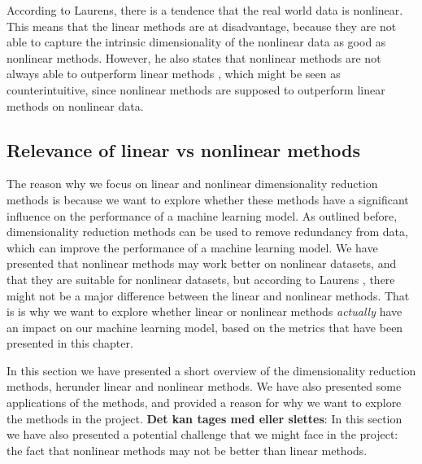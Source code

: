 According to Laurens, there is a tendence that the real world data is nonlinear. This means that the linear methods are at disadvantage, because they are not able to capture the intrinsic dimensionality of the nonlinear data as good as nonlinear methods. However, he also states that nonlinear methods are not always able to outperform linear methods \cite{dimensionality-reduction-comparative-review}, which might be seen as counterintuitive, since nonlinear methods are supposed to outperform linear methods on nonlinear data.

\subsection{Relevance of linear vs nonlinear methods}
The reason why we focus on linear and nonlinear dimensionality reduction methods is because we want to explore whether these methods have a significant influence on the performance of a machine learning model. As outlined before, dimensionality reduction methods can be used to remove redundancy from data, which can improve the performance of a machine learning model. We have presented that nonlinear methods may work better on nonlinear datasets, and that they are suitable for nonlinear datasets, but according to Laurens \cite{dimensionality-reduction-comparative-review}, there might not be a major difference between the linear and nonlinear methods. That is is why we want to explore whether linear or nonlinear methods \textit{actually} have an impact on our machine learning model, based on the metrics that have been presented in this chapter. 


In this section we have presented a short overview of the dimensionality reduction methods, herunder linear and nonlinear methods. We have also presented some applications of the methods, and provided a reason for why we want to explore the methods in the project. \textbf{Det kan tages med eller slettes}: In this section we have also presented a potential challenge that we might face in the project: the fact that nonlinear methods may not be better than linear methods.


